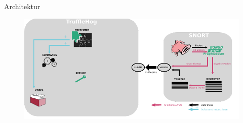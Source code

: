 \begin{frame}{Architektur}
    \begin{figure}
    	\centering
    	\includegraphics[width=\textwidth]{./images/11.pdf}
    \end{figure}
\end{frame}
